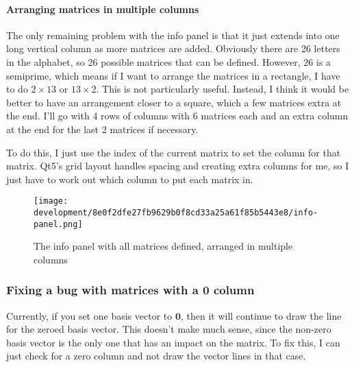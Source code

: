 \documentclass[../development.tex]{subfiles}
\begin{document}
\paragraph{Arranging matrices in multiple columns\label{development:teacher-suggestions:adding-the-info-panel:arranging-matrices-in-multiple-columns}}

The only remaining problem with the info panel is that it just extends into one long vertical column as more matrices are added. Obviously there are 26 letters in the alphabet, so 26 possible matrices that can be defined. However, 26 is a semiprime, which means if I want to arrange the matrices in a rectangle, I have to do $2 \times 13$ or $13 \times 2$. This is not particularly useful. Instead, I think it would be better to have an arrangement closer to a square, which a few matrices extra at the end. I'll go with 4 rows of columns with 6 matrices each and an extra column at the end for the last 2 matrices if necessary.

To do this, I just use the index of the current matrix to set the column for that matrix. Qt5's grid layout handles spacing and creating extra columns for me, so I just have to work out which column to put each matrix in.


\begin{figure}[H]
	\centering
	\texttt{[image: development/8e0f2dfe27fb9629b0f8cd33a25a61f85b5443e8/info-panel.png]}
	\caption{The info panel with all matrices defined, arranged in multiple columns}
	\label{fig:development:8e0f2dfe27fb9629b0f8cd33a25a61f85b5443e8:info-panel.png}
\end{figure}

\subsubsection{Fixing a bug with matrices with a 0 column\label{development:teacher-suggestions:fixing-a-bug-with-matrices-with-a-0-column}}

Currently, if you set one basis vector to $\mathbf{0}$, then it will continue to draw the line for the zeroed basis vector. This doesn't make much sense, since the non-zero basis vector is the only one that has an impact on the matrix. To fix this, I can just check for a zero column and not draw the vector lines in that case.

\end{document}
